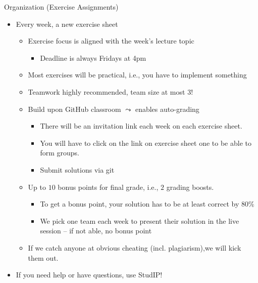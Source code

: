 \documentclass[aspectratio=169]{../latex_main/tntbeamer}  %
\begin{document}
\begin{frame}[c]{Organization (Exercise Assignments)}
	
	\begin{itemize}
	\item Every week, a new exercise sheet
	\begin{itemize}
		\item Exercise focus is aligned with the week's lecture topic
		\begin{itemize}
		    \item \alert{Deadline} is always Fridays at 4pm
		\end{itemize}
		\item Most exercises will be practical, i.e., you have to implement something
		\item Teamwork highly recommended, team size at most 3! 
		\pause
		\item Build upon GitHub classroom $\leadsto$ enables auto-grading
		\begin{itemize}
			\item There will be an invitation link each week on each exercise sheet.
			\item You will have to click on the link on exercise sheet one to be able to form groups.
			\item Submit solutions via git
		\end{itemize}
		\pause
		\item Up to \alert{$10$ bonus points} for final grade, i.e., $2$ grading boosts.
		\begin{itemize}
		    \item To get a bonus point, your solution has to be at least correct by $80\%$
                \item We pick one team each week to present their solution in the live session -- if not able, no bonus point
		\end{itemize}
		\pause
		\item If we catch anyone at obvious cheating (incl. plagiarism),\newline we will kick them out.
	\end{itemize}
	\pause
	\item \alert{If you need help or have questions, use StudIP!}
	\end{itemize}
	
\end{frame}
\end{document}
